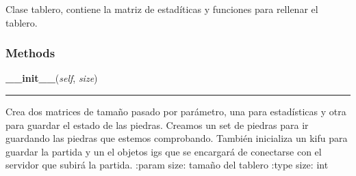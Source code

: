     \label{src:goban:Goban}
Clase tablero, contiene la matriz de estadíticas y funciones para rellenar 
el tablero.



  \subsubsection{Methods}

    \label{src:goban:Goban:__init__}

    \vspace{0.5ex}

\hspace{.8\funcindent}\begin{boxedminipage}{\funcwidth}

    \raggedright \textbf{\_\_init\_\_}(\textit{self}, \textit{size})

    \vspace{-1.5ex}

    \rule{\textwidth}{0.5\fboxrule}
\setlength{\parskip}{2ex}
    Crea dos matrices de tamaño pasado por parámetro, una para estadísticas
    y otra para guardar el estado de las piedras. Creamos un set de piedras
    para ir guardando las piedras que estemos comprobando. También 
    inicializa un kifu para guardar la partida y un el objetos igs que se 
    encargará de conectarse con el servidor que subirá la partida. :param 
    size: tamaño del tablero :type size: int

\setlength{\parskip}{1ex}
    \end{boxedminipage}

    \label{src:goban:Goban:add_stones_to_statistical}

    \vspace{0.5ex}

